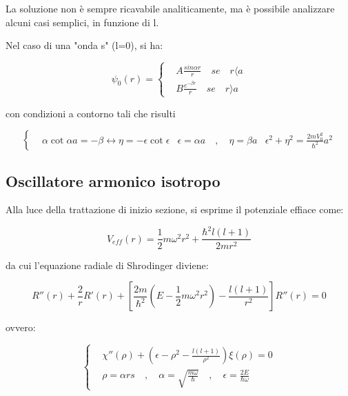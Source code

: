 \documentclass{article}
\begin{document}
La soluzione non è sempre ricavabile analiticamente, ma è possibile analizzare alcuni casi semplici, in funzione di l.

Nel caso di una "onda s" (l=0), si ha:

\begin{equation}
  \psi_0(r)=
  \left\{
  \begin{aligned}
     & A\frac{sin{\alpha r}}{r} \quad se \quad r\langle a \\
     & B\frac{e^{-\beta r}}{r} \quad se \quad r\rangle a
  \end{aligned}
  \right.
\end{equation}

con condizioni a contorno tali che risulti

\begin{equation}
  \left\{
  \begin{aligned}
     & \alpha \cot{\alpha a}=-\beta \leftrightarrow \eta=-\epsilon \cot{\epsilon}
     & \epsilon=\alpha a \quad , \quad \eta=\beta a
     & \epsilon^2+\eta^2=\frac{2mV_0^2}{\hbar^2}a^2
  \end{aligned}
  \right.
\end{equation}

\subsection{Oscillatore armonico isotropo}
Alla luce della trattazione di inizio sezione, si esprime il potenziale effiace come:

\begin{equation}
  V_{eff}(r)=\frac{1}{2}m\omega^2r^2+\frac{\hbar^2l(l+1)}{2mr^2}
\end{equation}

da cui l'equazione radiale di Shrodinger diviene:

\begin{equation}
  R''(r)+\frac{2}{r}R'(r)+\left[\frac{2m}{\hbar^2}\left(E-\frac{1}{2}m\omega^2r^2\right)-\frac{l(l+1)}{r^2}\right]R''(r)=0
\end{equation}

ovvero:

\begin{equation}
  \left\{
  \begin{aligned}
     & \chi''(\rho)+\left(\epsilon -\rho^2-\frac{l(l+1)}{\rho^2}\right)\xi(\rho)=0                                     \\
     & \rho=\alpha rs \quad , \quad \alpha=\sqrt{\frac{m\omega}{\hbar}} \quad , \quad \epsilon=\frac{2E}{\hbar \omega}
  \end{aligned}
  \right.
\end{equation}
\end{document}
